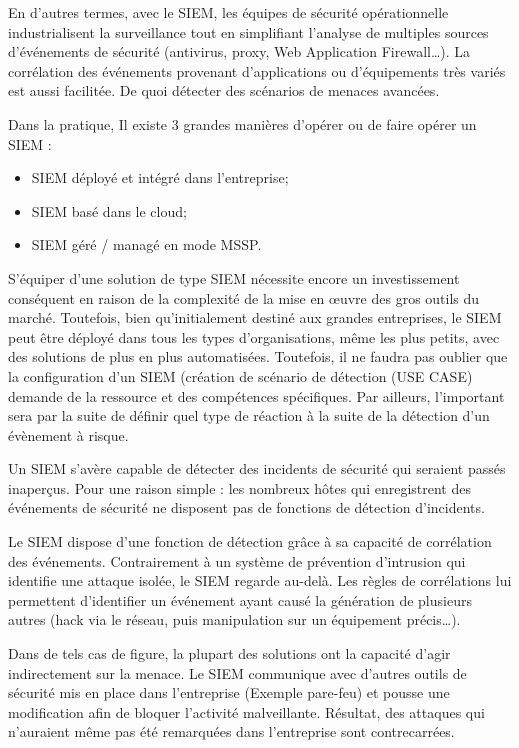 En d’autres termes, avec le SIEM, les équipes de sécurité opérationnelle industrialisent la surveillance tout en simplifiant l’analyse de multiples sources d’événements de sécurité (antivirus, proxy, Web Application Firewall…). La corrélation des événements provenant d’applications ou d’équipements très variés est aussi facilitée. De quoi détecter des scénarios de menaces avancées.

Dans la pratique, Il existe 3 grandes manières d'opérer ou de faire opérer un SIEM :

\begin{itemize}
  \item SIEM  déployé et intégré dans l'entreprise;
  \item SIEM basé dans le cloud;
  \item SIEM géré / managé en mode MSSP.
\end{itemize}

S'équiper d’une solution de type SIEM nécessite encore un investissement conséquent en raison de la complexité de la mise en œuvre des gros outils du marché. Toutefois, bien qu’initialement destiné aux grandes entreprises, le SIEM peut être déployé dans tous les types d’organisations, même les plus petits, avec des solutions de plus en plus automatisées. Toutefois, il ne faudra pas oublier que la configuration d'un SIEM (création de scénario de détection (USE CASE) demande de la ressource et des compétences spécifiques.
Par ailleurs, l'important sera par la suite de définir quel type de réaction à la suite de la détection d'un évènement à risque.


Un SIEM s’avère capable de détecter des incidents de sécurité qui seraient passés inaperçus. Pour une raison simple : les nombreux hôtes qui enregistrent des événements de sécurité ne disposent pas de fonctions de détection d’incidents.

Le SIEM dispose d'une fonction de détection grâce à sa capacité de corrélation des événements. Contrairement à un système de prévention d’intrusion qui identifie une attaque isolée, le SIEM regarde au-delà. Les règles de corrélations lui permettent d’identifier un événement ayant causé la génération de plusieurs autres (hack via le réseau, puis manipulation sur un équipement précis…).

Dans de tels cas de figure, la plupart des solutions ont la capacité d’agir indirectement sur la menace. Le SIEM communique avec d’autres outils de sécurité mis en place dans l’entreprise (Exemple pare-feu) et pousse une modification afin de bloquer l’activité malveillante. Résultat, des attaques qui n’auraient même pas été remarquées dans l’entreprise sont contrecarrées.

